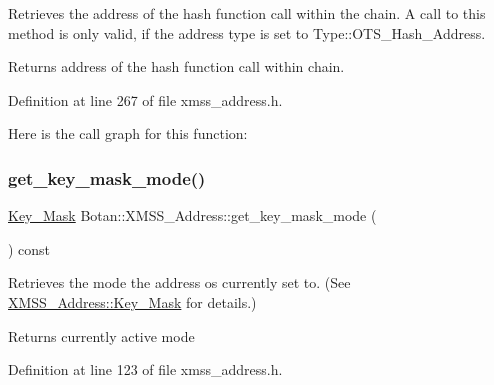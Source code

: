 Retrieves the address of the hash function call within the chain. A call to this method is only valid, if the address type is set to Type\+::\+O\+T\+S\+\_\+\+Hash\+\_\+\+Address.

\begin{DoxyReturn}{Returns}
address of the hash function call within chain. 
\end{DoxyReturn}


Definition at line 267 of file xmss\+\_\+address.\+h.

Here is the call graph for this function\+:
\mbox{\label{class_botan_1_1_x_m_s_s___address_af74b11e3ced49d405e2c84ca51191d61}} 
\subsubsection{\texorpdfstring{get\+\_\+key\+\_\+mask\+\_\+mode()}{get\_key\_mask\_mode()}}
{\footnotesize\ttfamily \mbox{\hyperlink{class_botan_1_1_x_m_s_s___address_a85146c0c3e049f62c413194049f501e3}{Key\+\_\+\+Mask}} Botan\+::\+X\+M\+S\+S\+\_\+\+Address\+::get\+\_\+key\+\_\+mask\+\_\+mode (\begin{DoxyParamCaption}{ }\end{DoxyParamCaption}) const\hspace{0.3cm}{\ttfamily [inline]}}

Retrieves the mode the address os currently set to. (See \mbox{\hyperlink{class_botan_1_1_x_m_s_s___address_a85146c0c3e049f62c413194049f501e3}{X\+M\+S\+S\+\_\+\+Address\+::\+Key\+\_\+\+Mask}} for details.)

\begin{DoxyReturn}{Returns}
currently active mode 
\end{DoxyReturn}


Definition at line 123 of file xmss\+\_\+address.\+h.

\mbox{\label{class_botan_1_1_x_m_s_s___address_ac71959711edb3f719e371942247f2c74}} 
